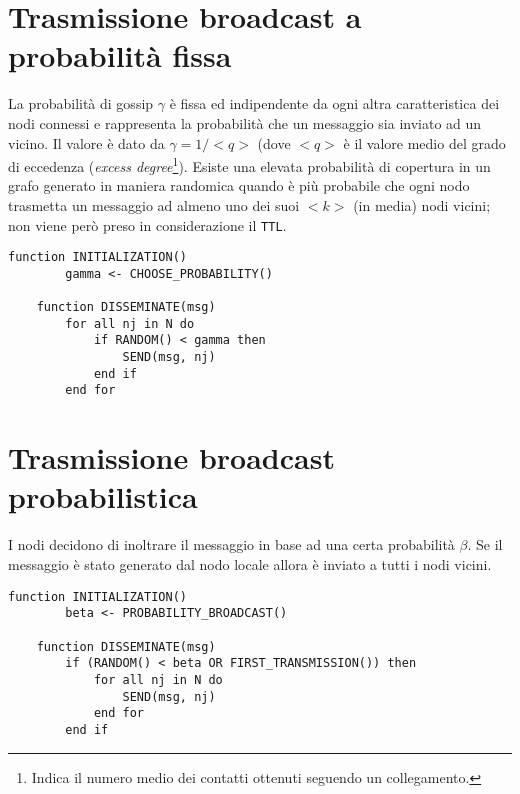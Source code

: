 \begin{appendices}
    \section{Trasmissione broadcast a probabilità fissa}
    La probabilità di gossip $\gamma$ è fissa ed indipendente da ogni altra caratteristica dei nodi connessi e rappresenta la probabilità che un messaggio sia inviato ad un vicino. Il valore è dato da $\gamma = 1/<q>$ (dove $<q>$ è il valore medio del grado di eccedenza (\textit{excess degree}\footnote{Indica il numero medio dei contatti ottenuti seguendo un collegamento.}).\newline
    Esiste una elevata probabilità di copertura in un grafo generato in maniera randomica quando è più probabile che ogni nodo trasmetta un messaggio ad almeno uno dei suoi $<k>$ (in media) nodi vicini; non viene però preso in considerazione il \texttt{TTL}.
    \begin{lstlisting}[caption=Pseudocodice dell'algoritmo di diffusione con $\gamma$ fisso]
    function INITIALIZATION()
        gamma <- CHOOSE_PROBABILITY()
    
    function DISSEMINATE(msg)
        for all nj in N do
            if RANDOM() < gamma then
                SEND(msg, nj)
            end if
        end for
    \end{lstlisting}
    
    \section{Trasmissione broadcast probabilistica}
    I nodi decidono di inoltrare il messaggio in base ad una certa probabilità $\beta$. Se il messaggio è stato generato dal nodo locale allora è inviato a tutti i nodi vicini.
    
    \begin{lstlisting}[caption=Pseudocodice dell'algoritmo di diffusione con a broadcast probabilistica]
    function INITIALIZATION()
        beta <- PROBABILITY_BROADCAST()
    
    function DISSEMINATE(msg)
        if (RANDOM() < beta OR FIRST_TRANSMISSION()) then
            for all nj in N do
                SEND(msg, nj)
            end for
        end if
    \end{lstlisting}
    

\end{appendices}
